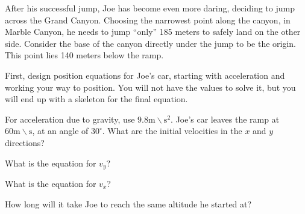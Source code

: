 \documentclass{ximera}
\begin{document}
\begin{question}
After his successful jump, Joe has become even more daring, deciding to jump across the Grand Canyon. Choosing the narrowest point along the canyon, in Marble Canyon, he needs to jump ``only'' 185 meters to safely land on the other side. Consider the base of the canyon directly under the jump to be the origin. This point lies 140 meters below the ramp.

First, design position equations for Joe's car, starting with acceleration and working your way to position. You will not have the values to solve it, but you will end up with a skeleton for the final equation.

\begin{multipleChoice}
\end{multipleChoice}

For acceleration due to gravity, use $9.8 \text{m} \backslash \text{s}^2$. Joe's car leaves the ramp at $60 \text{m}\backslash \text{s}$, at an angle of $30^\circ$. What are the initial velocities in the $x$ and $y$ directions?

\begin{multipleChoice}
\end{multipleChoice}

What is the equation for $v_{y}$?
\begin{multipleChoice}
\end{multipleChoice}
What is the equation for $v_x$?
\begin{multipleChoice}
\end{multipleChoice}
How long will it take Joe to reach the same altitude he started at?
\begin{multipleChoice}
\end{multipleChoice}


\end{question}
\end{document}
